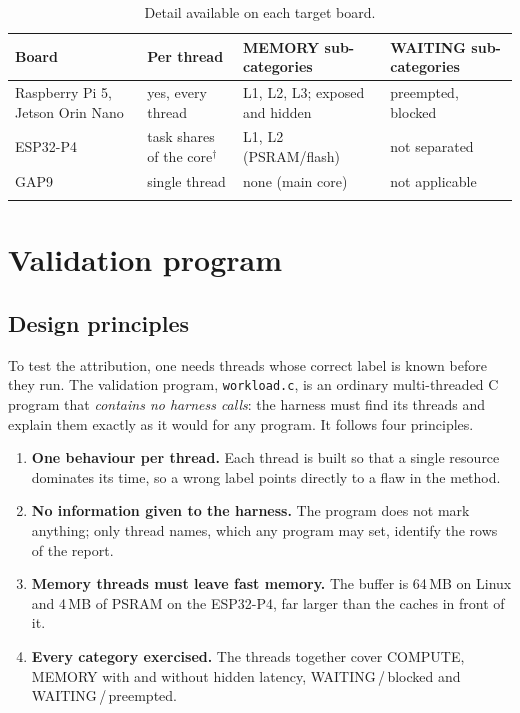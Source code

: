 \documentclass[10pt,a4paper,twocolumn]{article}
\newcommand{\code}[1]{\texttt{\small #1}}
\begin{document}
\begin{table}[t]
\centering\footnotesize
\caption{Detail available on each target board.}
\label{tab:detail}
\begin{tabularx}{\columnwidth}{|>{\raggedright\arraybackslash}p{1.5cm}|L|L|L|}
\hline
\textbf{Board} & \textbf{Per thread} & \textbf{MEMORY sub-categories} & \textbf{WAITING sub-categories} \\ \hline
Raspberry Pi 5, Jetson Orin Nano & yes, every thread & L1, L2, L3; exposed and hidden & preempted, blocked \\ \hline
ESP32-P4 & task shares of the core$^{\dagger}$ & L1, L2 (PSRAM/flash) & not separated \\ \hline
GAP9 & single thread & none (main core) & not applicable \\ \hline
{} \\ \hline
\end{tabularx}
\end{table}

\section{Validation program}

\subsection{Design principles}
To test the attribution, one needs threads whose correct label is known before they run. The validation program, \code{workload.c}, is an ordinary multi-threaded C program that \emph{contains no harness calls}: the harness must find its threads and explain them exactly as it would for any program. It follows four principles.
\begin{enumerate}
  \item \textbf{One behaviour per thread.} Each thread is built so that a single resource dominates its time, so a wrong label points directly to a flaw in the method.
  \item \textbf{No information given to the harness.} The program does not mark anything; only thread names, which any program may set, identify the rows of the report.
  \item \textbf{Memory threads must leave fast memory.} The buffer is 64\,MB on Linux and 4\,MB of PSRAM on the ESP32-P4, far larger than the caches in front of it.
  \item \textbf{Every category exercised.} The threads together cover COMPUTE, MEMORY with and without hidden latency, WAITING\,/\,blocked and WAITING\,/\,preempted.
\end{enumerate}
\end{document}
